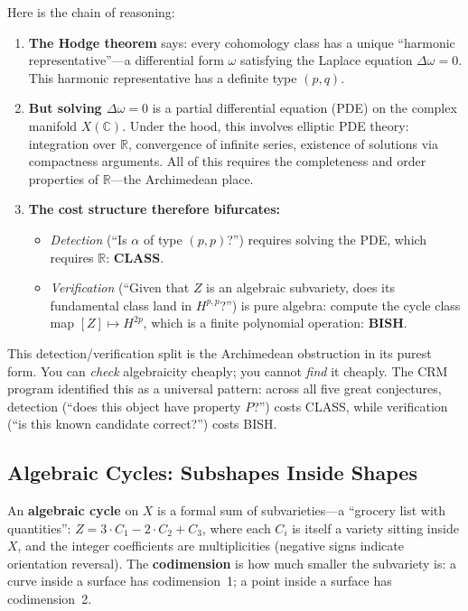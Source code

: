 \documentclass[11pt,twoside,openany]{report}
\theoremstyle{remark}
\newcommand{\BISH}{\textsf{BISH}}
\newcommand{\CLASS}{\textsf{CLASS}}
\begin{document}
Here is the chain of reasoning:
\begin{enumerate}
  \item \textbf{The Hodge theorem} says: every cohomology class has a unique ``harmonic representative''---a differential form $\omega$ satisfying the Laplace equation $\Delta \omega = 0$. This harmonic representative has a definite type $(p,q)$.
  \item \textbf{But solving $\Delta \omega = 0$} is a partial differential equation (PDE) on the complex manifold $X(\mathbb{C})$. Under the hood, this involves elliptic PDE theory: integration over $\mathbb{R}$, convergence of infinite series, existence of solutions via compactness arguments. All of this requires the completeness and order properties of $\mathbb{R}$---the Archimedean place.
  \item \textbf{The cost structure therefore bifurcates:}
  \begin{itemize}
    \item \emph{Detection} (``Is $\alpha$ of type $(p,p)$?'') requires solving the PDE, which requires $\mathbb{R}$: \textbf{\CLASS}.
    \item \emph{Verification} (``Given that $Z$ is an algebraic subvariety, does its fundamental class land in $H^{p,p}$?'') is pure algebra: compute the cycle class map $[Z] \mapsto H^{2p}$, which is a finite polynomial operation: \textbf{\BISH}.
  \end{itemize}
\end{enumerate}

This detection/verification split is the Archimedean obstruction in its purest form. You can \emph{check} algebraicity cheaply; you cannot \emph{find} it cheaply. The CRM program identified this as a universal pattern: across all five great conjectures, detection (``does this object have property $P$?'') costs \CLASS, while verification (``is this known candidate correct?'') costs \BISH.

\subsection*{Algebraic Cycles: Subshapes Inside Shapes}

An \textbf{algebraic cycle} on $X$ is a formal sum of subvarieties---a ``grocery list with quantities'': $Z = 3 \cdot C_1 - 2 \cdot C_2 + C_3$, where each $C_i$ is itself a variety sitting inside $X$, and the integer coefficients are multiplicities (negative signs indicate orientation reversal). The \textbf{codimension} is how much smaller the subvariety is: a curve inside a surface has codimension~1; a point inside a surface has codimension~2.
\end{document}
